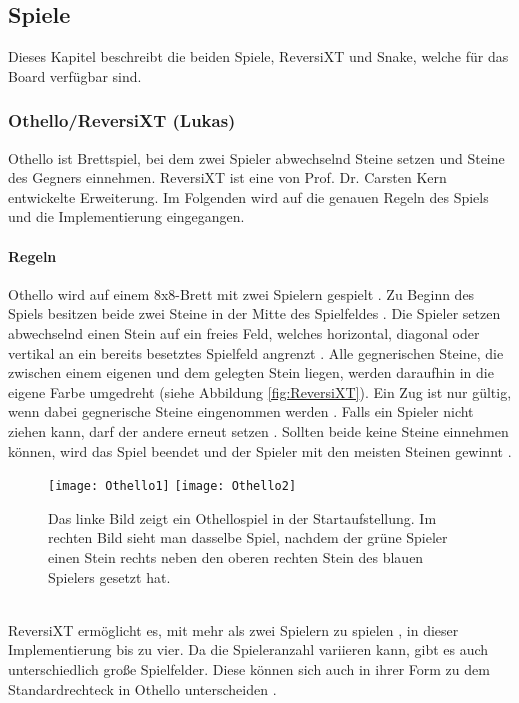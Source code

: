 \documentclass[12pt,a4paper]{article}
\begin{document}
\subsection{Spiele}
Dieses Kapitel beschreibt die beiden Spiele, ReversiXT und Snake, welche für das Board verfügbar sind.

\subsubsection{Othello/ReversiXT (Lukas)}
Othello ist Brettspiel, bei dem zwei Spieler abwechselnd Steine setzen und Steine des Gegners einnehmen. ReversiXT ist eine von Prof. Dr. Carsten Kern entwickelte Erweiterung. Im Folgenden wird auf die genauen Regeln des Spiels und die Implementierung eingegangen.
\paragraph{Regeln}
Othello wird auf einem 8x8-Brett mit zwei Spielern gespielt \cite{Othello:Regeln}. Zu Beginn des Spiels besitzen beide zwei Steine in der Mitte des Spielfeldes \cite{Othello:Regeln}. Die Spieler setzen abwechselnd einen Stein auf ein freies Feld, welches horizontal, diagonal oder vertikal an ein bereits besetztes Spielfeld angrenzt \cite{Othello:Regeln}. Alle gegnerischen Steine, die zwischen einem eigenen und dem gelegten Stein liegen, werden daraufhin in die eigene Farbe umgedreht \cite{Othello:Regeln} (siehe Abbildung \ref{fig:ReversiXT}). Ein Zug ist nur gültig, wenn dabei gegnerische Steine eingenommen werden \cite{Othello:Regeln}. Falls ein Spieler nicht ziehen kann, darf der andere erneut setzen \cite{Othello:Regeln}. Sollten beide keine Steine einnehmen können, wird das Spiel beendet und der Spieler mit den meisten Steinen gewinnt \cite{Othello:Regeln}.
\begin{figure}[h]
\centering
\texttt{[image: Othello1]}
\texttt{[image: Othello2]}
\caption{\label{fig:Othello}Das linke Bild zeigt ein Othellospiel in der Startaufstellung. Im rechten Bild sieht man dasselbe Spiel, nachdem der grüne Spieler einen Stein rechts neben den oberen rechten Stein des blauen Spielers gesetzt hat.}
\end{figure}
\vspace{1ex}\\
ReversiXT ermöglicht es, mit mehr als zwei Spielern zu spielen \cite{ReversiXT:Doku}, in dieser Implementierung bis zu vier. Da die Spieleranzahl variieren kann, gibt es auch unterschiedlich große Spielfelder. Diese können sich auch in ihrer Form zu dem Standardrechteck in Othello unterscheiden \cite{ReversiXT:Doku}.
\end{document}
